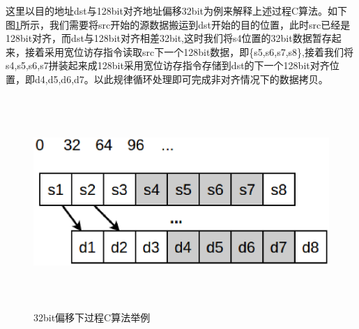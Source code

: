 \begin{itemize}
这里以目的地址dst与128bit对齐地址偏移32bit为例来解释上述过程C算法。如下图\ref{fig:offset32}所示，我们需要将src开始的源数据搬运到dst开始的目的位置，此时src已经是128bit对齐，而dst与128bit对齐相差32bit,这时我们将s4位置的32bit数据暂存起来，接着采用宽位访存指令读取src下一个128bit数据，即\{s5,s6,s7,s8\},接着我们将s4,s5,s6,s7拼装起来成128bit采用宽位访存指令存储到dst的下一个128bit对齐位置，即{d4,d5,d6,d7}。以此规律循环处理即可完成非对齐情况下的数据拷贝。


\begin{figure}[H] 
  \centering
  \includegraphics[width=12cm,height=8cm]{figures/chap03/offset32}
  \caption{32bit偏移下过程C算法举例}
  \label{fig:offset32}
\end{figure}


\end{itemize}

